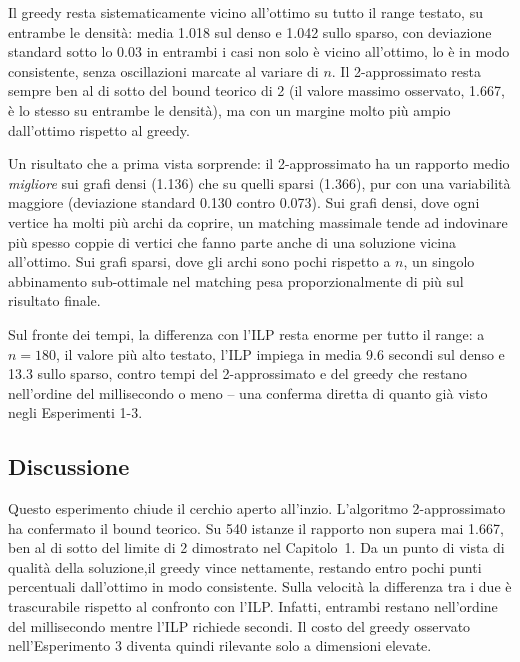 Il greedy resta sistematicamente vicino all'ottimo su tutto il range testato, su entrambe le densità: media 1.018 sul denso e 1.042 sullo sparso, con deviazione standard sotto lo 0.03 in entrambi i casi non solo è vicino all'ottimo, lo è in modo consistente, senza oscillazioni marcate al variare di $n$. 
Il 2-approssimato resta sempre ben al di sotto del bound teorico di 2 (il valore massimo osservato, 1.667, è lo stesso su entrambe le densità), ma con un margine molto più ampio dall'ottimo rispetto al greedy.

Un risultato che a prima vista sorprende: il 2-approssimato ha un rapporto medio \emph{migliore} sui grafi densi (1.136) che su quelli sparsi (1.366), pur con una variabilità maggiore (deviazione standard 0.130 contro 0.073). 
Sui grafi densi, dove ogni vertice ha molti più archi da coprire, un matching massimale tende ad indovinare più spesso coppie di vertici che fanno parte anche di una soluzione vicina all'ottimo. 
Sui grafi sparsi, dove gli archi sono pochi rispetto a $n$, un singolo abbinamento sub-ottimale nel matching pesa proporzionalmente di più sul risultato finale.

Sul fronte dei tempi, la differenza con l'ILP resta enorme per tutto il range: a $n=180$, il valore più alto testato, l'ILP impiega in media 9.6 secondi sul denso e 13.3 sullo sparso, contro tempi del 2-approssimato e del greedy che restano nell'ordine del millisecondo o meno -- una conferma diretta di quanto già visto negli Esperimenti 1-3.

\subsection{Discussione}

Questo esperimento chiude il cerchio aperto all'inzio. L'algoritmo 2-approssimato ha confermato il bound teorico. 
Su 540 istanze il rapporto non supera mai 1.667, ben al di sotto del limite di 2 dimostrato nel Capitolo~1. 
Da un punto di vista di qualità della soluzione,il greedy vince nettamente, restando entro pochi punti percentuali dall'ottimo in modo consistente. 
Sulla velocità la differenza tra i due è trascurabile rispetto al confronto con l'ILP. Infatti, entrambi restano nell'ordine del millisecondo mentre l'ILP richiede secondi. 
Il costo del greedy osservato nell'Esperimento 3 diventa quindi rilevante solo a dimensioni elevate. 